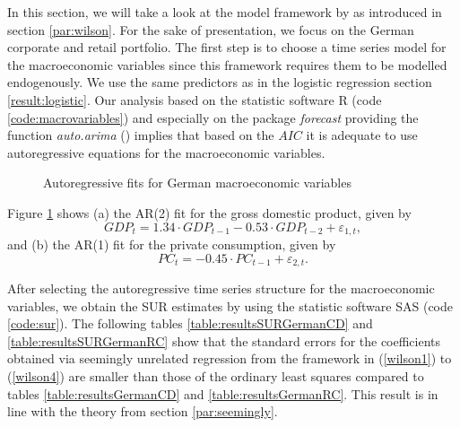 \documentclass[a4paper, 11pt]{scrreprt}
\begin{document}
In this section, we will take a look at the model framework by \textcite{wilson1997wilsonI} as introduced in section \ref{par:wilson}. For the sake of presentation, we focus on the German corporate and retail portfolio. The first step is to choose a time series model for the macroeconomic variables since this framework requires them to be modelled endogenously.
We use the same predictors as in the logistic regression section \ref{result:logistic}.
Our analysis based on the statistic software R (code \ref{code:macrovariables}) and especially on the package \textit{forecast} providing the function \textit{auto.arima} (\textcite{hyndman2017forecast}) implies that based on the $AIC$ it is adequate to use autoregressive equations for the macroeconomic variables. 


\begin{figure}[H]
	\caption{Autoregressive fits for German macroeconomic variables}
	\label{plot:ARfit}
\end{figure}

Figure \ref{plot:ARfit} shows (a) the AR(2) fit for the gross domestic product, given by
\begin{equation*}
GDP_t = 1.34 \cdot GDP_{t-1} - 0.53 \cdot GDP_{t-2} + \varepsilon_{1,t},
\end{equation*}
and (b) the AR(1) fit for the private consumption, given by
\begin{equation*}
PC_t = -0.45 \cdot PC_{t-1} + \varepsilon_{2,t}.
\end{equation*}


After selecting the autoregressive time series structure for the macroeconomic variables, we obtain the SUR estimates by using the statistic software SAS (code \ref{code:sur}).
The following tables \ref{table:resultsSURGermanCD} and \ref{table:resultsSURGermanRC} show that the standard errors for the coefficients obtained via seemingly unrelated regression from the framework in (\ref{wilson1}) to (\ref{wilson4}) are smaller than those of the ordinary least squares compared to tables \ref{table:resultsGermanCD} and \ref{table:resultsGermanRC}.
This result is in line with the theory from section \ref{par:seemingly}.

\bigskip
\end{document}

